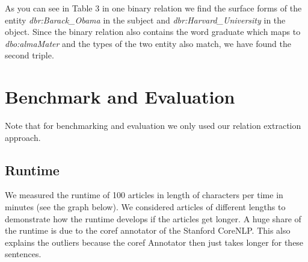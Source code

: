 \documentclass[runningheads]{llncs}
\begin{document}
As you can see in Table 3 in one binary relation we find the surface forms of the entity \textit{dbr:Barack\_Obama} in the subject and \textit{dbr:Harvard\_University} in the object. Since the binary relation also contains the word graduate which maps to \textit{dbo:almaMater} and the types of the two entity also match, we have found the second triple. 


\section{Benchmark and Evaluation}
Note that for benchmarking and evaluation we only used our relation extraction approach.
\subsection{Runtime}
We measured the runtime of 100 articles in length of characters per time in minutes (see the graph below). We considered articles of different lengths to demonstrate how the runtime develops if the articles get longer. A huge share of the runtime is due to the coref annotator of the Stanford CoreNLP. This also explains the outliers because the coref Annotator then just takes longer for these sentences.

  
\end{document}
